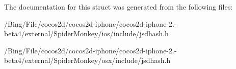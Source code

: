 The documentation for this struct was generated from the following files\-:\begin{DoxyCompactItemize}
\item 
/\-Bing/\-File/cocos2d/cocos2d-\/iphone/cocos2d-\/iphone-\/2.-\/beta4/external/\-Spider\-Monkey/ios/include/jsdhash.\-h\item 
/\-Bing/\-File/cocos2d/cocos2d-\/iphone/cocos2d-\/iphone-\/2.-\/beta4/external/\-Spider\-Monkey/osx/include/jsdhash.\-h\end{DoxyCompactItemize}
